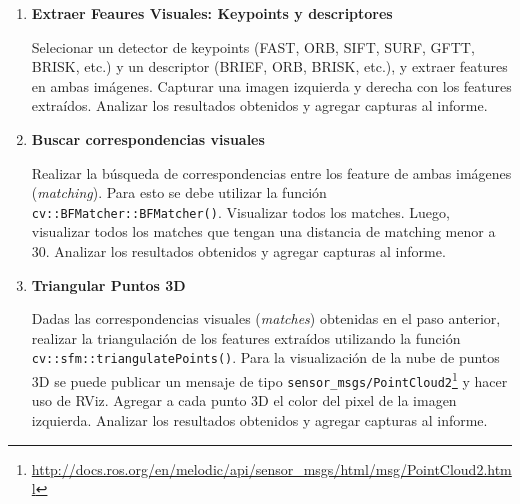 \documentclass[tp]{lcc}
\begin{document}
\begin{enumerate}
\begin{itemize}
        Para reproducir el rosbag y remapear los tópicos a los que el paquete \lstinline{stereo_image_proc} requiere puede hacer:
\begin{lstlisting}[style=bash]   
ros2 bag play CARPETA_ROSBAG --remap /stereo/left/image_raw:=/left/image_raw \
/stereo/left/camera_info:=/left/camera_info \
/stereo/right/image_raw:=/right/image_raw \
/stereo/right/camera_info:=/right/camera_info
\end{lstlisting}
        
        
        \item o bien, OpenCV, por medio de las funciones: \lstinline{cv::stereoRectify()},  \lstinline{cv::initUndistortRectifyMap()} y  \lstinline{remap()}.
        
    \end{itemize}

    Analizar los resultados obtenidos. Agregar capturas al informe.

\item \textbf{Extraer Feaures Visuales: Keypoints y descriptores}

Selecionar un detector de keypoints (FAST, ORB, SIFT, SURF, GFTT, BRISK, etc.) y un descriptor (BRIEF, ORB, BRISK, etc.), y extraer features en ambas imágenes. Capturar una imagen izquierda y derecha con los features extraídos. Analizar los resultados obtenidos y agregar capturas al informe.

\item \textbf{Buscar correspondencias visuales}

Realizar la búsqueda de correspondencias entre los feature de ambas imágenes (\emph{matching}). Para esto se debe utilizar la función \lstinline{cv::BFMatcher::BFMatcher()}. Visualizar todos los matches. Luego, visualizar todos los matches que tengan una distancia de matching menor a 30. Analizar los resultados obtenidos y agregar capturas al informe.

\item \textbf{Triangular Puntos 3D}

Dadas las correspondencias visuales (\emph{matches}) obtenidas en el paso anterior, realizar la triangulación de los features extraídos utilizando la función \lstinline{cv::sfm::triangulatePoints()}. Para la visualización de la nube de puntos 3D se puede publicar un mensaje de tipo \lstinline{sensor_msgs/PointCloud2}\footnote{\url{http://docs.ros.org/en/melodic/api/sensor_msgs/html/msg/PointCloud2.html}} y hacer uso de RViz. Agregar a cada punto 3D el color del pixel de la imagen izquierda.  Analizar los resultados obtenidos y agregar capturas al informe.


\end{enumerate}
\end{document}
